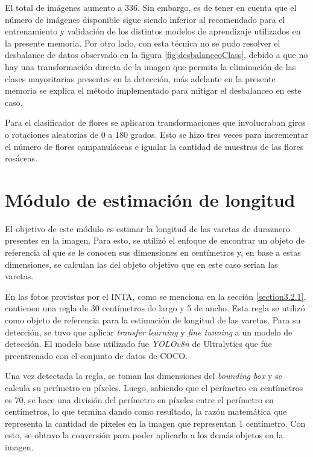 El total de imágenes aumento a 336. Sin embargo, es de tener en cuenta que el número de imágenes disponible sigue siendo inferior al recomendado para el entrenamiento y validación de los distintos modelos de aprendizaje utilizados en la presente memoria. Por otro lado, con esta técnica no se pudo resolver el desbalance de datos observado en la figura \ref{fig:desbalanceoClass}, debido a que no hay una transformación directa de la imagen que permita la eliminación de las clases mayoritarias presentes en la detección, más adelante en la presente memoria se explica el método implementado para mitigar el desbalanceo en este caso. 

Para el clasificador de flores se aplicaron transformaciones que involucraban giros o rotaciones aleatorias de 0 a 180 grados. Esto se hizo tres veces para incrementar el número de flores campanuláceas e igualar la cantidad de muestras de las flores rosáceas.

\section{Módulo de estimación de longitud}

El objetivo de este módulo es estimar la longitud de las varetas de duraznero presentes en la imagen. Para esto, se utilizó el enfoque de encontrar un objeto de referencia al que se le conocen sus dimensiones en centímetros y, en base a estas dimensiones, se calculan las del objeto objetivo que en este caso serían las varetas. 

En las fotos provistas por el INTA, como se menciona en la sección \ref{section3.2.1}, contienen una regla de 30 centímetros de largo y 5 de ancho. Esta regla se utilizó como objeto de referencia para la estimación de longitud de las varetas. Para su detección, se tuvo que aplicar \textit{transfer learning} y \textit{fine tunning} a un modelo de detección. El modelo base utilizado fue \textit{YOLOv8n} de Ultralytics que fue preentrenado con el conjunto de datos de COCO.

Una vez detectada la regla, se toman las dimensiones del \textit{bounding box} y se calcula su perímetro en píxeles. Luego, sabiendo que el perímetro en centímetros es 70, se hace una división del perímetro en píxeles entre el perímetro en centímetros, lo que termina dando como resultado, la razón matemática que representa la cantidad de píxeles en la imagen que representan 1 centímetro. Con esto, se obtuvo la conversión para poder aplicarla a los demás objetos en la imagen.

